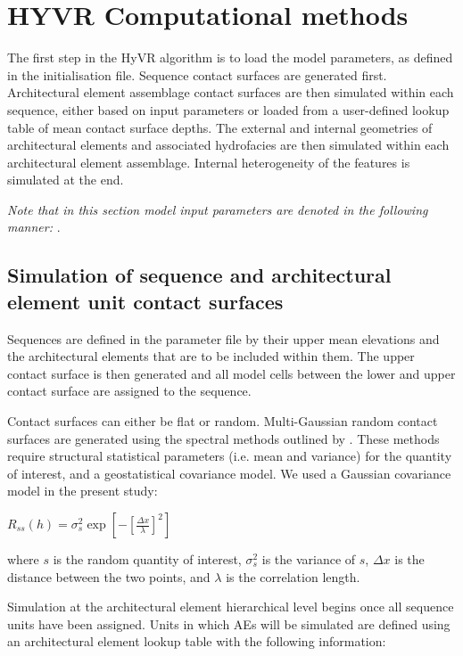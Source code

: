 \documentclass[letterpaper,10pt,english]{sphinxmanual}
\begin{document}
\chapter{HYVR Computational methods}
\label{methods::doc}\label{methods:hyvr-computational-methods}
The first step in the HyVR algorithm is to load the model parameters, as defined in the  initialisation file. Sequence contact surfaces are generated first. Architectural element assemblage contact surfaces are then simulated within each sequence, either based on input parameters or loaded from a user-defined lookup table of mean contact surface depths. The external and internal geometries of architectural elements and associated hydrofacies are then simulated within each architectural element assemblage. Internal heterogeneity of the features is simulated at the end.

\emph{Note that in this section model input parameters are denoted in the following manner:} .


\section{Simulation of sequence and architectural element unit contact surfaces}
\label{methods:simulation-of-sequence-and-architectural-element-unit-contact-surfaces}
Sequences are defined in the parameter file by their upper mean elevations and the architectural elements that are to be included within them. The upper contact surface is then generated and all model cells between the lower and upper contact surface are assigned to the sequence.

Contact surfaces can either be flat or random. Multi-Gaussian random contact surfaces are generated using the spectral methods outlined by \label{methods:id1}{\hyperref[references:dietrich1993]{\sphinxcrossref{{[}DN93{]}}}}.  These methods require structural statistical parameters (i.e. mean and variance) for the quantity of interest, and a geostatistical covariance model. We used a Gaussian covariance model in the present study:

\(R_{ss}(h)=\sigma^2_s \exp\left[ - \left[ \frac{\Delta x}{\lambda}\right]^2 \right]\)

where \(s\) is the random quantity of interest, \(\sigma^2_s\) is the variance of \(s\), \(\Delta x\) is the distance between the two points, and \(\lambda\) is the correlation length.

Simulation at the architectural element hierarchical level begins once all sequence units have been assigned. Units in which AEs will be simulated are defined using an architectural element lookup table with the following information:
\end{document}
